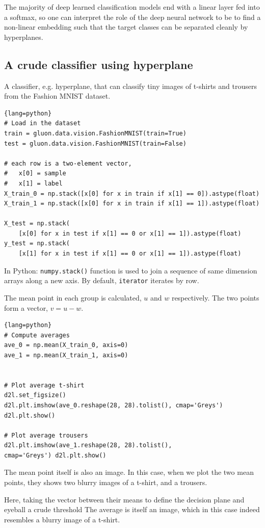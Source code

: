 The majority of deep learned classification models end with a linear layer fed
into a softmax, so one can interpret the role of the deep neural network to be
to find a non-linear embedding such that the target classes can be separated
cleanly by hyperplanes.

\subsection{A crude classifier using hyperplane}
\label{sec:math-hyperplane-threshold}

A classifier, e.g. hyperplane, that can classify tiny images of t-shirts and
trousers from the Fashion MNIST dataset.
\begin{lstlisting}{lang=python}
# Load in the dataset
train = gluon.data.vision.FashionMNIST(train=True)
test = gluon.data.vision.FashionMNIST(train=False)

# each row is a two-element vector, 
#   x[0] = sample
#   x[1] = label
X_train_0 = np.stack([x[0] for x in train if x[1] == 0]).astype(float)
X_train_1 = np.stack([x[0] for x in train if x[1] == 1]).astype(float)

X_test = np.stack(
    [x[0] for x in test if x[1] == 0 or x[1] == 1]).astype(float)
y_test = np.stack(
    [x[1] for x in test if x[1] == 0 or x[1] == 1]).astype(float)

\end{lstlisting}
In Python: \verb!numpy.stack()! function is used to join a sequence of same
dimension arrays along a new axis. By default, \verb!iterator! iterates by row. 

The mean point in each group is calculated, $u$ and $w$ respectively. The two
points form a vector, $v=u-w$.
\begin{lstlisting}{lang=python}
# Compute averages
ave_0 = np.mean(X_train_0, axis=0)
ave_1 = np.mean(X_train_1, axis=0)


# Plot average t-shirt
d2l.set_figsize()
d2l.plt.imshow(ave_0.reshape(28, 28).tolist(), cmap='Greys')
d2l.plt.show()

# Plot average trousers 
d2l.plt.imshow(ave_1.reshape(28, 28).tolist(),
cmap='Greys') d2l.plt.show()
\end{lstlisting}
The mean point itself is also an image. In this case, when we plot the two mean
points, they shows two blurry images of a t-shirt, and a trousers.

Here, taking the vector between their means to define the decision plane and
eyeball a crude threshold The average is itself an image, which in this case
indeed resembles a blurry image of a t-shirt.
 
